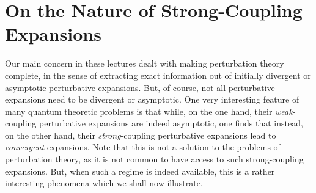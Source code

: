 \documentclass[11pt,a4paper]{article}
\begin{document}
\section{On the Nature of Strong-Coupling Expansions}\label{app:strongcoupling}


Our main concern in these lectures dealt with making perturbation theory complete, in the sense of extracting exact information out of initially divergent or asymptotic perturbative expansions. But, of course, not all perturbative expansions need to be divergent or asymptotic. One very interesting feature of many quantum theoretic problems is that while, on the one hand, their \textit{weak}-coupling perturbative expansions are indeed asymptotic, one finds that instead, on the other hand, their \textit{strong}-coupling perturbative expansions lead to \textit{convergent} expansions. Note that this is not a solution to the problems of perturbation theory, as it is not common to have access to such strong-coupling expansions. But, when such a regime is indeed available, this is a rather interesting phenomena which we shall now illustrate.
\end{document}
